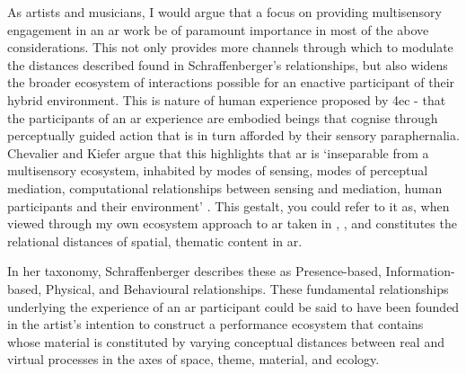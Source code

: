 As artists and musicians, I would argue that a focus on providing multisensory engagement in an \gls{ar} work be of paramount importance in most of the above considerations. This not only provides more channels through which to modulate the distances described found in Schraffenberger's relationships, but also widens the broader ecosystem of interactions possible for an enactive participant of their hybrid environment. This is nature of human experience proposed by \gls{4ec} - that the participants of an \gls{ar} experience are embodied beings that cognise through perceptually guided action that is in turn afforded by their sensory paraphernalia. 
Chevalier and Kiefer argue that this highlights that \gls{ar} is `inseparable from a multisensory ecosystem, inhabited by modes of sensing, modes of perceptual mediation, computational relationships between sensing and mediation, human participants and their environment' \citeyearpar[p. 4]{chevalier2020}. This gestalt, you could refer to it as, when viewed through my own ecosystem approach to \gls{ar} taken in \textit{}, \textit{}, and \textit{} constitutes the relational distances of spatial, thematic content in \gls{ar}. 

In her taxonomy, Schraffenberger describes these as Presence-based, Information-based, Physical, and Behavioural relationships. These fundamental relationships underlying the experience of an \gls{ar} participant could be said to have been founded in the artist's intention to construct a performance ecosystem that contains whose material is constituted by varying conceptual distances between real and virtual processes in the axes of space, theme, material, and ecology. 

